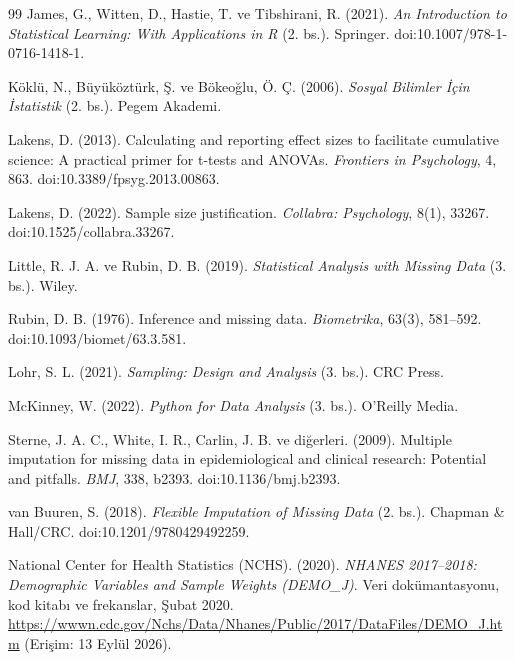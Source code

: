 \begin{thebibliography}{99}
\ifimoders\else
{}
James, G., Witten, D., Hastie, T. ve Tibshirani, R. (2021).
\textit{An Introduction to Statistical Learning: With Applications in R}
(2. bs.). Springer. doi:10.1007/978-1-0716-1418-1.
\fi

Köklü, N., Büyüköztürk, Ş. ve Bökeoğlu, Ö. Ç. (2006).
\textit{Sosyal Bilimler İçin İstatistik} (2. bs.). Pegem Akademi.

Lakens, D. (2013). Calculating and reporting effect sizes to facilitate
cumulative science: A practical primer for t-tests and ANOVAs.
\textit{Frontiers in Psychology}, 4, 863.
doi:10.3389/fpsyg.2013.00863.

Lakens, D. (2022). Sample size justification.
\textit{Collabra: Psychology}, 8(1), 33267.
doi:10.1525/collabra.33267.

Little, R. J. A. ve Rubin, D. B. (2019).
\textit{Statistical Analysis with Missing Data} (3. bs.). Wiley.

Rubin, D. B. (1976). Inference and missing data.
\textit{Biometrika}, 63(3), 581--592.
doi:10.1093/biomet/63.3.581.

Lohr, S. L. (2021).
\textit{Sampling: Design and Analysis} (3. bs.). CRC Press.

McKinney, W. (2022).
\textit{Python for Data Analysis} (3. bs.). O'Reilly Media.

Sterne, J. A. C., White, I. R., Carlin, J. B. ve diğerleri. (2009).
Multiple imputation for missing data in epidemiological and clinical research:
Potential and pitfalls. \textit{BMJ}, 338, b2393.
doi:10.1136/bmj.b2393.

van Buuren, S. (2018).
\textit{Flexible Imputation of Missing Data} (2. bs.). Chapman \& Hall/CRC.
doi:10.1201/9780429492259.

National Center for Health Statistics (NCHS). (2020).
\textit{NHANES 2017--2018: Demographic Variables and Sample Weights
(DEMO\_J)}. Veri dokümantasyonu, kod kitabı ve frekanslar, Şubat 2020.
\url{https://wwwn.cdc.gov/Nchs/Data/Nhanes/Public/2017/DataFiles/DEMO_J.htm}
(Erişim: 13 Eylül 2026).


\end{thebibliography}
